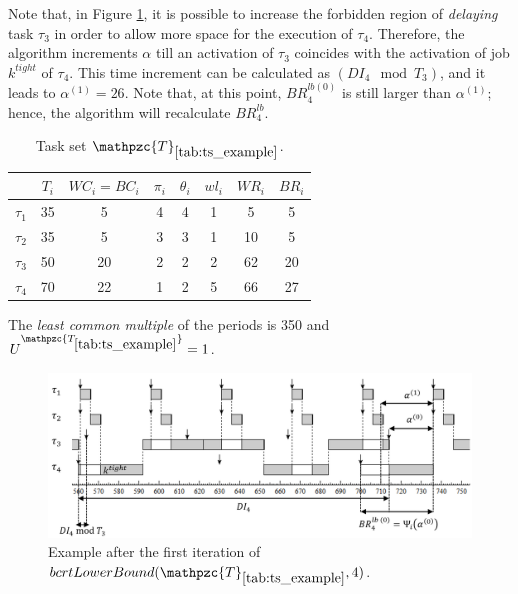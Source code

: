 \documentclass[fleqn]{article}
\begin{document}
Note that, in Figure \ref{fig:bcrt_lb_ex1}, it is possible to increase the forbidden region of \textit{delaying} task $\tau_3$ in order to allow more space for the execution of $\tau_4$. Therefore, the algorithm increments $\alpha$ till an activation of $\tau_3$ coincides with the activation of job $k^{tight}$ of $\tau_4$. This time increment can be calculated as $(DI_4 \mod T_3)$, and it leads to $\alpha^{(1)}=26$. Note that, at this point, $BR^{lb (0)}_4$ is still larger than $\alpha^{(1)}$; hence, the algorithm will recalculate $BR^{lb}_4$.


\begin{table}[H]
	\center
	\caption{Task set $\mathpzc{T}_{\ref{tab:ts_example}}$.}
	\label{tab:ts_example}
	\begin{tabular}{c c c c c | c c c}
		\hline 
		& $T_i$ & $WC_i=BC_i$ & $\pi_i$ & $\theta_i$ &  $wl_i$ & $WR_i$ & $BR_i$\\ 
		\hline 
		$\tau_1$& 35 & 5  & 4 & 4 &  1 & 5 & 5\\ 
		$\tau_2$& 35 & 5  & 3 & 3 &  1 & 10 & 5\\ 
		$\tau_3$& 50 & 20 & 2 & 2 &  2 & 62 & 20\\ 
		$\tau_4$& 70 & 22 & 1 & 2 &  5 & 66 & 27\\
		\hline 
	\end{tabular}
	\small
	\item The \textit{least common multiple} of the periods is 350 and $U^{\mathpzc{T_{\ref{tab:ts_example}}}}=1$.
\end{table}

\begin{figure}[H]
	\centering
	\includegraphics[width=1\linewidth]{figures/bcrt_lb_ex1.PNG}
	\caption{Example after the first iteration of $bcrtLowerBound(\mathpzc{T}_{\ref{tab:ts_example}},4)$. }
	\label{fig:bcrt_lb_ex1}
\end{figure}
\end{document}
